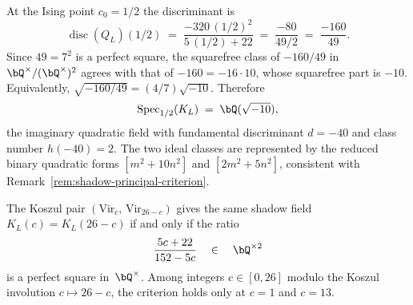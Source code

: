 \begin{example}[Specialisation at the Ising point $c_0 = 1/2$]%
\label{ex:specialised-shadow-field-ising}%
At the Ising point $c_0 = 1/2$ the discriminant is
\[
 \operatorname{disc}(Q_L)(1/2)
 \;=\;
 \frac{-320\,(1/2)^2}{5\,(1/2) + 22}
 \;=\;
 \frac{-80}{49/2}
 \;=\;
 \frac{-160}{49}.
\]
Since $49 = 7^2$ is a perfect square, the squarefree class of
$-160/49$ in $\bQ^\times/(\bQ^\times)^2$ agrees with that of
$-160 = -16 \cdot 10$, whose squarefree part is $-10$.
Equivalently, $\sqrt{-160/49} = (4/7)\sqrt{-10}$.
Therefore
\[
 \operatorname{Spec}_{1/2}(K_L)
 \;=\;
 \bQ(\sqrt{-10}),
\]
the imaginary quadratic field with fundamental discriminant
$d = -40$ and class number $h(-40) = 2$. The two ideal classes
are represented by the reduced binary quadratic forms
$[m^2 + 10n^2]$ and $[2m^2 + 5n^2]$, consistent with
Remark~\textup{\ref{rem:shadow-principal-criterion}}.
\end{example}

\begin{proposition}%
\label{prop:koszul-field-criterion}%
\ClaimStatusProvedHere%
%
The Koszul pair $(\mathrm{Vir}_c,\, \mathrm{Vir}_{26-c})$
gives the same shadow field
$K_L(c) = K_L(26-c)$
if and only if the ratio
\begin{equation}\label{eq:koszul-field-ratio}
 \frac{5c + 22}{152 - 5c}
 \quad\in\quad \bQ^{\times 2}
\end{equation}
is a perfect square in~$\bQ^\times$.
Among integers $c \in [0, 26]$ modulo the Koszul involution
$c \mapsto 26 - c$, the criterion holds only at
$c = 1$ and $c = 13$.
\end{proposition}

